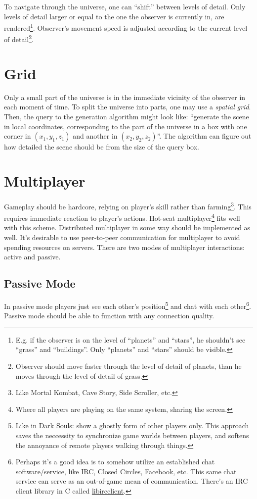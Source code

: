 \documentclass[12pt]{article}
\begin{document}
To navigate through the universe, one can ``shift'' between levels of detail.
Only levels of detail larger or equal to the one the observer is currently in,
are rendered\footnote{
    E.g. if the observer is on the level of ``planets'' and ``stars'',
    he shouldn't see ``grass'' and ``buildings''.
    Only ``planets'' and ``stars'' should be visible.}.
Observer's movement speed is adjusted according to the current level of
detail\footnote{
    Observer should move faster through the level of detail of planets,
    than he moves through the level of detail of grass.
}.

\section{Grid}

Only a small part of the universe is in the immediate vicinity of the observer
in each moment of time.
To split the universe into parts, one may use a \emph{spatial grid}.
Then, the query to the generation algorithm might look like:
``generate the scene in local coordinates, corresponding to the part of the
universe in a box with one corner in \((x_1, y_1, z_1)\) and another in
\((x_2, y_2, z_2)\)''.
The algorithm can figure out how detailed the scene should be from the size of
the query box.

\section{Multiplayer}

Gameplay should be hardcore, relying on player's skill rather than
farming\footnote{
    Like Mortal Kombat, Cave Story, Side Scroller, etc.}.
This requires immediate reaction to player's actions.
Hot-seat multiplayer\footnote{
    Where all players are playing on the same system, sharing
    the screen.
} fits well with this scheme.
Distributed multiplayer in some way should be implemented as well.
It's desirable to use peer-to-peer communication for multiplayer
to avoid spending resources on servers.
There are two modes of multiplayer interactions: active and passive.

\subsection{Passive Mode}

In passive mode players just see each other's position\footnote{
    Like in Dark Souls: show a ghostly form of other players only.
    This approach saves the neccessity to synchronize game worlds
    between players, and softens the annoyance of remote players
    walking through things.
} and chat with each other\footnote{
    \label{Chat}
    Perhaps it's a good idea is to somehow utilize an established chat
    software/service, like IRC, Closed Circles, Facebook, etc.
    This same chat service can serve as an out-of-game mean of
    communication.
    There's an IRC client library in C called
    \href{http://www.ulduzsoft.com/libircclient/index.html}%
    {libircclient}.
}.
Passive mode should be able to function with any connection quality.
\end{document}
